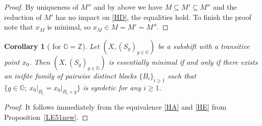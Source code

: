 \documentclass[leqno,a4paper,12pt]{article}
\newtheorem{Cor}[Th]{Corollary}
\theoremstyle{definition}
\newcommand{\Z}{{\mathbb{Z}}}
\newcommand{\G}{\mathbb{G}}
\begin{document}
\begin{proof}
By uniqueness of $M''$ and by above we have $M\subseteq M'\subseteq M''$ and the reduction of $M'$ has no impact on \eqref{HD}, the equalities hold. To finish the proof note that $x_M$ is minimal, so $x_M\in M=M'=M''$.
\end{proof}
\begin{Cor}[{\cite[Corollary 2.17]{MR3803141} for $\G=\Z$}]\label{dlapod}
Let $(X,(S_g)_{g\in\G})$ be a subshift with a transitive point $x_0$. Then $(X,(S_{g})_{g\in\G})$ is essentially minimal if and only if there exists an inifite family of pairwise distinct blocks $\{B_i\}_{i\geq1}$ such that $\{g\in\G;\ {x_0|}_{B_i}={x_0|}_{B_i+g}\}$ is syndetic for any $i\geq1$.
\end{Cor}
\begin{proof}
It follows immediately from the equivalence \eqref{HA} and \eqref{HE} from Proposition~\ref{LE51new}.
\end{proof}
\end{document}
